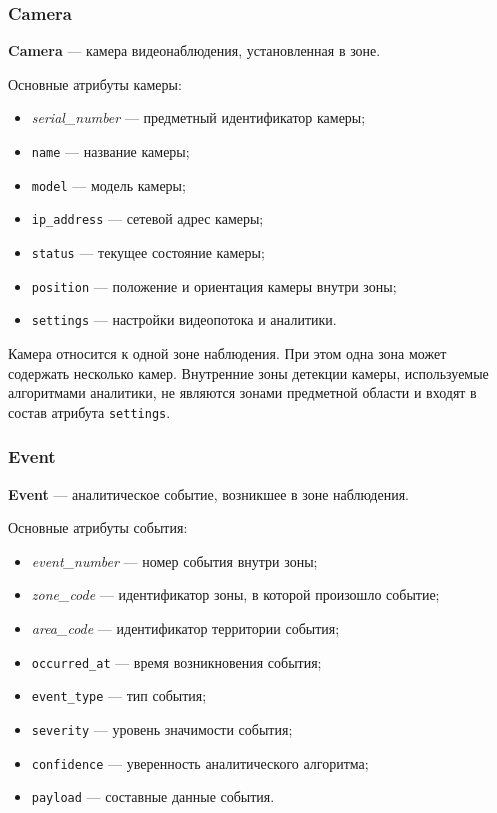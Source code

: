 \subsubsection{Camera}

\textbf{Camera} --- камера видеонаблюдения, установленная в зоне.

Основные атрибуты камеры:

\begin{itemize}
  \item \emph{serial\_number} --- предметный идентификатор камеры;
  \item \texttt{name} --- название камеры;
  \item \texttt{model} --- модель камеры;
  \item \texttt{ip\_address} --- сетевой адрес камеры;
  \item \texttt{status} --- текущее состояние камеры;
  \item \texttt{position} --- положение и ориентация камеры внутри зоны;
  \item \texttt{settings} --- настройки видеопотока и аналитики.
\end{itemize}

Камера относится к одной зоне наблюдения. При этом одна зона может содержать
несколько камер. Внутренние зоны детекции камеры, используемые алгоритмами
аналитики, не являются зонами предметной области и входят в состав
атрибута \texttt{settings}.

\subsubsection{Event}

\textbf{Event} --- аналитическое событие, возникшее в зоне наблюдения.

Основные атрибуты события:

\begin{itemize}
  \item \emph{event\_number} --- номер события внутри зоны;
  \item \emph{zone\_code} --- идентификатор зоны, в которой произошло
        событие;
  \item \emph{area\_code} --- идентификатор территории события;
  \item \texttt{occurred\_at} --- время возникновения события;
  \item \texttt{event\_type} --- тип события;
  \item \texttt{severity} --- уровень значимости события;
  \item \texttt{confidence} --- уверенность аналитического алгоритма;
  \item \texttt{payload} --- составные данные события.
\end{itemize}


